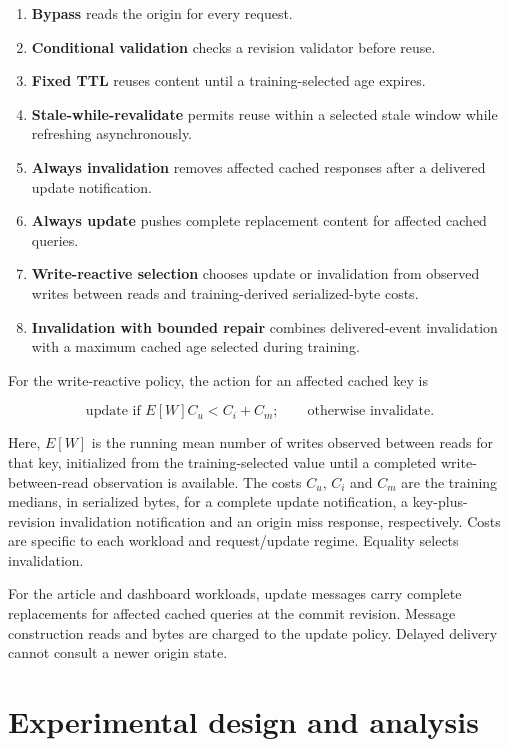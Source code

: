 \documentclass[pdflatex,sn-mathphys-num]{sn-jnl}
\providecommand{\tightlist}{\setlength{\itemsep}{0pt}\setlength{\parskip}{0pt}}
\begin{document}
\begin{enumerate}
\def\labelenumi{\arabic{enumi}.}
\tightlist
\item
  \textbf{Bypass} reads the origin for every request.
\item
  \textbf{Conditional validation} checks a revision validator before reuse.
\item
  \textbf{Fixed TTL} reuses content until a training-selected age expires.
\item
  \textbf{Stale-while-revalidate} permits reuse within a selected stale window while refreshing asynchronously.
\item
  \textbf{Always invalidation} removes affected cached responses after a delivered update notification.
\item
  \textbf{Always update} pushes complete replacement content for affected cached queries.
\item
  \textbf{Write-reactive selection} chooses update or invalidation from observed writes between reads and training-derived serialized-byte costs.
\item
  \textbf{Invalidation with bounded repair} combines delivered-event invalidation with a maximum cached age selected during training.
\end{enumerate}

For the write-reactive policy, the action for an affected cached key is

\[
\text{update if } E[W]C_u < C_i+C_m; \qquad \text{otherwise invalidate}.
\]

Here, \(E[W]\) is the running mean number of writes observed between reads for that key, initialized from the training-selected value until a completed write-between-read observation is available. The costs \(C_u\), \(C_i\) and \(C_m\) are the training medians, in serialized bytes, for a complete update notification, a key-plus-revision invalidation notification and an origin miss response, respectively. Costs are specific to each workload and request/update regime. Equality selects invalidation.

For the article and dashboard workloads, update messages carry complete replacements for affected cached queries at the commit revision. Message construction reads and bytes are charged to the update policy. Delayed delivery cannot consult a newer origin state.

\section{Experimental design and analysis}\label{experimental-design-and-analysis}
\end{document}
